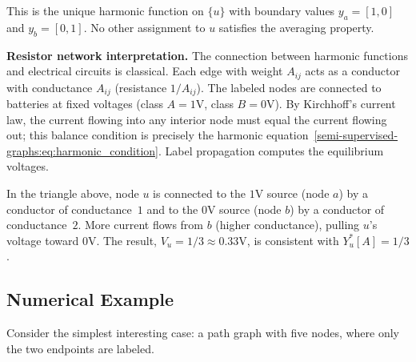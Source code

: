 \begin{notechapter}
This is the unique harmonic function on $\{u\}$ with boundary values
$y_a = [1,0]$ and $y_b = [0,1]$. No other assignment to $u$ satisfies the
averaging property.

\begin{insightbox}
\textbf{Resistor network interpretation.} The connection between harmonic
functions and electrical circuits is classical. Each edge with weight $A_{ij}$
acts as a conductor with conductance $A_{ij}$ (resistance $1/A_{ij}$). The
labeled nodes are connected to batteries at fixed voltages (class
$A = 1\text{V}$, class $B = 0\text{V}$). By Kirchhoff's current law, the
current flowing into any interior node must equal the current flowing out;
this balance condition is precisely the harmonic
equation~\eqref{semi-supervised-graphs:eq:harmonic_condition}. Label propagation computes the
equilibrium voltages.

In the triangle above, node $u$ is connected to the $1$V source (node $a$)
by a conductor of conductance~$1$ and to the $0$V source (node $b$) by a
conductor of conductance~$2$. More current flows from $b$ (higher
conductance), pulling $u$'s voltage toward $0$V. The result,
$V_u = 1/3 \approx 0.33\text{V}$, is consistent with $Y_u^*[A] = 1/3$.
\end{insightbox}

\subsection{Numerical Example}
\label{semi-supervised-graphs:subsec:lp_example}

\begin{example}
\label{semi-supervised-graphs:ex:lp_path}
Consider the simplest interesting case: a path graph with five nodes, where
only the two endpoints are labeled.

\begin{center}
\end{center}


\end{example}
\end{notechapter}
